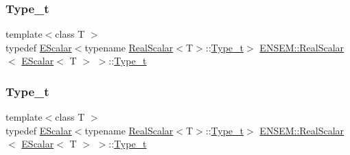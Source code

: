 \subsubsection{\texorpdfstring{Type\_t}{Type\_t}\hspace{0.1cm}{\footnotesize\ttfamily [1/3]}}
{\footnotesize\ttfamily template$<$class T $>$ \\
typedef \mbox{\hyperlink{classENSEM_1_1EScalar}{E\+Scalar}}$<$typename \mbox{\hyperlink{structENSEM_1_1RealScalar}{Real\+Scalar}}$<$T$>$\+::\mbox{\hyperlink{structENSEM_1_1RealScalar_3_01EScalar_3_01T_01_4_01_4_a5aaad1821350deadcff050085f21ff07}{Type\+\_\+t}}$>$ \mbox{\hyperlink{structENSEM_1_1RealScalar}{E\+N\+S\+E\+M\+::\+Real\+Scalar}}$<$ \mbox{\hyperlink{classENSEM_1_1EScalar}{E\+Scalar}}$<$ T $>$ $>$\+::\mbox{\hyperlink{structENSEM_1_1RealScalar_3_01EScalar_3_01T_01_4_01_4_a5aaad1821350deadcff050085f21ff07}{Type\+\_\+t}}}

\mbox{\label{structENSEM_1_1RealScalar_3_01EScalar_3_01T_01_4_01_4_a5aaad1821350deadcff050085f21ff07}} 
\subsubsection{\texorpdfstring{Type\_t}{Type\_t}\hspace{0.1cm}{\footnotesize\ttfamily [2/3]}}
{\footnotesize\ttfamily template$<$class T $>$ \\
typedef \mbox{\hyperlink{classENSEM_1_1EScalar}{E\+Scalar}}$<$typename \mbox{\hyperlink{structENSEM_1_1RealScalar}{Real\+Scalar}}$<$T$>$\+::\mbox{\hyperlink{structENSEM_1_1RealScalar_3_01EScalar_3_01T_01_4_01_4_a5aaad1821350deadcff050085f21ff07}{Type\+\_\+t}}$>$ \mbox{\hyperlink{structENSEM_1_1RealScalar}{E\+N\+S\+E\+M\+::\+Real\+Scalar}}$<$ \mbox{\hyperlink{classENSEM_1_1EScalar}{E\+Scalar}}$<$ T $>$ $>$\+::\mbox{\hyperlink{structENSEM_1_1RealScalar_3_01EScalar_3_01T_01_4_01_4_a5aaad1821350deadcff050085f21ff07}{Type\+\_\+t}}}

\mbox{\label{structENSEM_1_1RealScalar_3_01EScalar_3_01T_01_4_01_4_a5aaad1821350deadcff050085f21ff07}} 
